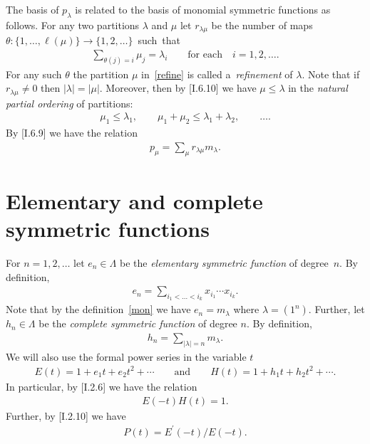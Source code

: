 The basis of $p_\lambda$ is related to the basis of monomial symmetric functions as follows.
For any two partitions $\lambda$ and $\mu$ let $r_{\lambda\mu}$ be the number of maps
$\theta:\{1,\ldots,\ell(\mu)\}\to\{1,2,\ldots\}$~such~that
\begin{gather}
\label{refine}
\sum_{\theta(j)=i}\mu_j=\lambda_i
\qquad
\text{for each}
\quad
i=1,2,\ldots.
\end{gather}
For any such $\theta$ the partition $\mu$ in~\eqref{refine} is called a~\textit{refinement} of $\lambda$.
Note that if $r_{\lambda\mu}\neq0$ then $|\lambda|=|\mu|$.
Moreover, then by [I.6.10] we have $\mu\le\lambda$ in the \textit{natural partial ordering} of partitions:
\begin{gather*}
\mu_1\le\lambda_1,\qquad \mu_1+\mu_2\le\lambda_1+\lambda_2,\qquad \ldots.
\end{gather*}
By [I.6.9] we have the relation
\begin{gather}\label{pm}
p_\mu=\sum_\mu r_{\lambda\mu}m_\lambda.
\end{gather}

\section{Elementary and complete symmetric functions}\label{Section4}

For $n=1,2,\ldots$ let $e_n\in\Lambda$ be the \textit{elementary symmetric function} of degree~$n$.
By def\/inition,
\begin{gather*}
e_n=\sum_{i_1<\dots<i_k}x_{i_1}\cdots x_{i_k}.
\end{gather*}
Note that by the def\/inition~\eqref{mon} we have $e_n=m_\lambda$ where $\lambda=(1^n)$.
Further, let $h_n\in\Lambda$ be the \textit{complete symmetric function} of degree $n$.
By def\/inition,
\begin{gather*}
h_n=\sum_{|\lambda|=n}m_\lambda.
\end{gather*}
We will also use the formal power series in the variable $t$
\begin{gather*}
E(t)=1+e_1t+e_2t^2+\cdots
\qquad
\text{and}
\qquad
H(t)=1+h_1t+h_2t^2+\cdots.
\end{gather*}
In particular, by [I.2.6] we have the relation
\begin{gather}
\label{eh}
E(-t)H(t)=1.
\end{gather}
Further, by [I.2.10] we have
\begin{gather}
\label{hep}
P(t)=E^{\prime}(-t)/E(-t).
\end{gather}

